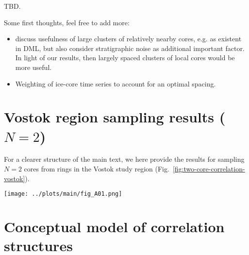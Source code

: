 \documentclass[cp, manuscript]{copernicus}
\begin{document}
TBD.

\noindent Some first thoughts, feel free to add more:
\begin{itemize}
\item discuss usefulness of large clusters of relatively nearby cores, e.g. as
  existent in DML, but also consider stratigraphic noise as additional important
  factor. In light of our results, then largely spaced clusters of local cores
  would be more useful.
\item Weighting of ice-core time series to account for an optimal spacing.
\end{itemize}


\appendix

\section{Vostok region sampling results ($N=2$)}
\label{app:vostok.n2}

For a clearer structure of the main text, we here provide the results for
sampling $N=2$ cores from rings in the Vostok study region
(Fig.~\ref{fig:two-core-correlation-vostok}).

\begin{figure*}[t]%
\centering
\texttt{[image: ../plots/main/fig\_A01.png]}
\caption{%
  The expected correlation with the target site temperature for the average of
  two cores in the Vostok region. Shown is the mean correlation of all possible
  single correlations from averaging two grid cells of (\textbf{a})
  $T_{\mathrm{2m}}$, (\textbf{b}) $T_{\mathrm{2m}}^{\mathrm{(pw)}}$ and
  (\textbf{c}) $\delta^{18}\mathrm{O}^{\mathrm{(pw)}}$ time series sampled from
  the same or from two different rings, averaged over all target sites in
  the given region. The axes display the distance from the target, where the $x$
  ($y$) axis stands for the first (second) sampled ring and tickmarks
  indicate the radius of the midpoints of the rings. Note that for
  $\delta^{18}\mathrm{O}^{\mathrm{(pw)}}$ the -- albeit marginal -- correlation
  maximum is located for combining the innermost ring with the ring between
  $500$--$750$\,km.}
\label{fig:two-core-correlation-vostok}%
\end{figure*}%

\section{Conceptual model of correlation structures}
\label{app:concept.model}
\end{document}
